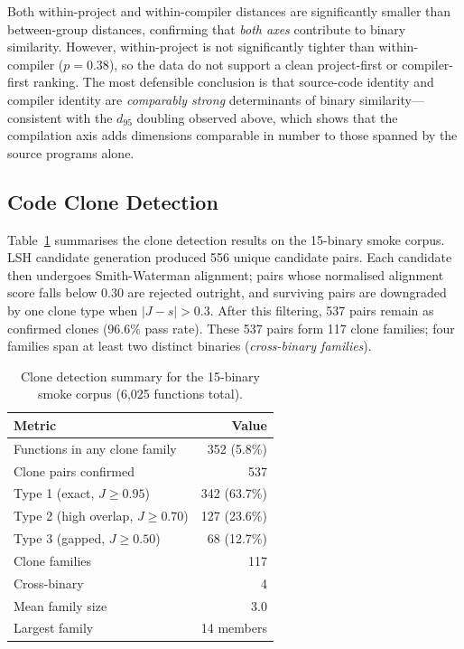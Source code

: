 \documentclass[10pt,twocolumn]{article}
\begin{document}
Both within-project and within-compiler distances are significantly smaller
than between-group distances, confirming that \emph{both axes} contribute to
binary similarity.  However, within-project is not significantly tighter
than within-compiler ($p = 0.38$), so the data do not support a clean
project-first or compiler-first ranking.  The most defensible conclusion is
that source-code identity and compiler identity are \emph{comparably strong}
determinants of binary similarity---consistent with the $d_{95}$ doubling
observed above, which shows that the compilation axis adds dimensions
comparable in number to those spanned by the source programs alone.

\subsection{Code Clone Detection}
\label{sec:clone_results}

Table~\ref{tab:clones} summarises the clone detection results on the 15-binary
smoke corpus.  LSH candidate generation produced 556 unique candidate pairs.
Each candidate then undergoes Smith-Waterman alignment; pairs whose
normalised alignment score falls below $0.30$ are rejected outright,
and surviving pairs are downgraded by one clone type when $|J - s| > 0.3$.
After this filtering, 537 pairs remain as confirmed clones ($96.6\%$
pass rate).  These 537 pairs form 117 clone families; four families
span at least two distinct binaries (\emph{cross-binary families}).

\begin{table}[h]
\centering
\caption{Clone detection summary for the 15-binary smoke corpus
         (6,025 functions total).}
\label{tab:clones}
\small
\begin{tabular}{@{}lr@{}}
\toprule
\textbf{Metric} & \textbf{Value} \\
\midrule
Functions in any clone family         & 352 (5.8\%) \\
Clone pairs confirmed                 & 537 \\
\quad Type 1 (exact, $J \geq 0.95$)  & 342 (63.7\%) \\
\quad Type 2 (high overlap, $J \geq 0.70$)& 127  (23.6\%) \\
\quad Type 3 (gapped, $J \geq 0.50$) & 68  (12.7\%) \\
Clone families                        & 117 \\
\quad Cross-binary                    & 4 \\
Mean family size                      & 3.0 \\
Largest family                        & 14 members \\
\bottomrule
\end{tabular}
\end{table}
\end{document}
